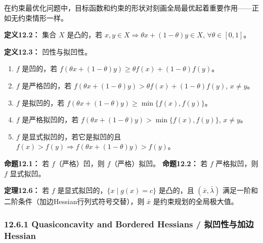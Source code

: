 \begin{translation}
在约束最优化问题中，目标函数和约束的形状对刻画全局最优起着重要作用——正如无约束情形一样。

\textbf{定义12.2：} 集合 $X$ 是凸的，若 $x, y \in X \Rightarrow \theta x + (1-\theta)y \in X$, $\forall \theta \in [0,1]$。

\textbf{定义12.3：} 凹性与拟凹性。
\begin{enumerate}
\item $f$ 是凹的，若 $f(\theta x + (1-\theta)y) \geq \theta f(x) + (1-\theta)f(y)$。
\item $f$ 是严格凹的，若 $f(\theta x + (1-\theta)y) > \theta f(x) + (1-\theta)f(y)$, $x \neq y$。
\item $f$ 是拟凹的，若 $f(\theta x + (1-\theta)y) \geq \min\{f(x), f(y)\}$。
\item $f$ 是严格拟凹的，若 $f(\theta x + (1-\theta)y) > \min\{f(x), f(y)\}$, $x \neq y$。
\item $f$ 是显式拟凹的，若它是拟凹的且 $f(x) > f(y) \Rightarrow f(\theta x + (1-\theta)y) > f(y)$。
\end{enumerate}

\textbf{命题12.1：} 若 $f$（严格）凹，则 $f$（严格）拟凹。
\textbf{命题12.2：} 若 $f$ 严格拟凹，则 $f$ 显式拟凹。

\textbf{定理12.6：} 若 $f$ 是显式拟凹的，$\{x \mid g(x) = c\}$ 是凸的，且 $(\bar{x}, \bar{\lambda})$ 满足一阶和二阶条件（加边Hessian行列式符号交替），则 $\bar{x}$ 是约束规划的全局极大值。
\end{translation}

\subsubsection{12.6.1 Quasiconcavity and Bordered Hessians / 拟凹性与加边Hessian}

